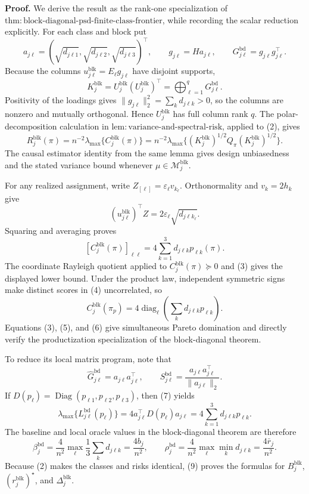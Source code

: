 \textbf{Proof.}
We derive the result as the rank-one specialization of \(\mathrm{thm:block\text{-}diagonal\text{-}psd\text{-}finite\text{-}class\text{-}frontier}\), while recording the scalar reduction explicitly. For each class and block put
\[
a_{j\ell}=(\sqrt{d_{j\ell1}},\sqrt{d_{j\ell2}},\sqrt{d_{j\ell3}})^\top,
\qquad
g_{j\ell}=Ha_{j\ell},
\qquad
G^{\mathrm{bd}}_{j\ell}=g_{j\ell}g_{j\ell}^\top.
\tag{1}
\]
Because the columns \(u^{\mathrm{blk}}_{j\ell}=E_\ell g_{j\ell}\) have disjoint supports,
\[
K_j^{\mathrm{blk}}
=U_j^{\mathrm{blk}}(U_j^{\mathrm{blk}})^\top
=\bigoplus_{\ell=1}^qG^{\mathrm{bd}}_{j\ell}.
\tag{2}
\]
Positivity of the loadings gives \(\|g_{j\ell}\|_2^2=\sum_kd_{j\ell k}>0\), so the columns are nonzero and mutually orthogonal. Hence \(U_j^{\mathrm{blk}}\) has full column rank \(q\). The polar-decomposition calculation in \(\mathrm{lem:variance\text{-}and\text{-}spectral\text{-}risk}\), applied to (2), gives
\[
R_j^{\mathrm{blk}}(\pi)
=n^{-2}\lambda_{\max}\{C_j^{\mathrm{blk}}(\pi)\}
=n^{-2}\lambda_{\max}\{(K_j^{\mathrm{blk}})^{1/2}Q_\pi(K_j^{\mathrm{blk}})^{1/2}\}.
\tag{3}
\]
The causal estimator identity from the same lemma gives design unbiasedness and the stated variance bound whenever \(\mu\in\mathcal M_j^{\mathrm{blk}}\).

For any realized assignment, write \(Z_{[\ell]}=\varepsilon_\ell v_{k_\ell}\). Orthonormality and \(v_k=2h_k\) give
\[
(u_{j\ell}^{\mathrm{blk}})^\top Z
=2\varepsilon_\ell\sqrt{d_{j\ell k_\ell}}.
\tag{4}
\]
Squaring and averaging proves
\[
[C_j^{\mathrm{blk}}(\pi)]_{\ell\ell}
=4\sum_{k=1}^3d_{j\ell k}p_{\ell k}(\pi).
\tag{5}
\]
The coordinate Rayleigh quotient applied to \(C_j^{\mathrm{blk}}(\pi)\succeq0\) and (3) gives the displayed lower bound. Under the product law, independent symmetric signs make distinct scores in (4) uncorrelated, so
\[
C_j^{\mathrm{blk}}(\pi_p)
=4\operatorname{diag}_\ell\left(\sum_kd_{j\ell k}p_{\ell k}\right).
\tag{6}
\]
Equations (3), (5), and (6) give simultaneous Pareto domination and directly verify the productization specialization of the block-diagonal theorem.

To reduce its local matrix program, note that
\[
\widehat G^{\mathrm{bd}}_{j\ell}=a_{j\ell}a_{j\ell}^\top,
\qquad
S^{\mathrm{bd}}_{j\ell}
=\frac{a_{j\ell}a_{j\ell}^\top}{\|a_{j\ell}\|_2}.
\tag{7}
\]
If \(D(p_\ell)=\operatorname{Diag}(p_{\ell1},p_{\ell2},p_{\ell3})\), then (7) yields
\[
\lambda_{\max}\{L^{\mathrm{bd}}_{j\ell}(p_\ell)\}
=4a_{j\ell}^\top D(p_\ell)a_{j\ell}
=4\sum_{k=1}^3d_{j\ell k}p_{\ell k}.
\tag{8}
\]
The baseline and local oracle values in the block-diagonal theorem are therefore
\[
\beta_j^{\mathrm{bd}}
=\frac4{n^2}\max_\ell\frac13\sum_kd_{j\ell k}
=\frac{4b_j}{n^2},
\qquad
\rho_j^{\mathrm{bd}}
=\frac4{n^2}\max_\ell\min_kd_{j\ell k}
=\frac{4\bar r_j}{n^2}.
\tag{9}
\]
Because (2) makes the classes and risks identical, (9) proves the formulas for \(B_j^{\mathrm{blk}}\), \((r_j^{\mathrm{blk}})^\star\), and \(\Delta_j^{\mathrm{blk}}\).

